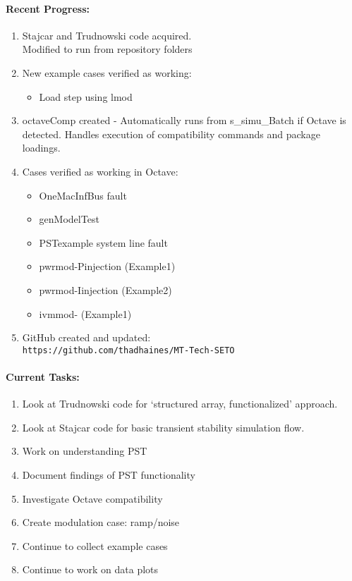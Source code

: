 \documentclass[12pt]{article}
\begin{document}
\begin{multicols}{2}
\raggedright

\paragraph{Recent Progress:}
	\begin{enumerate}
		\itemsep0em 
		\item Stajcar and Trudnowski code acquired. \\ 
		Modified to run from repository folders
		\item New example cases verified as working:
		\begin{itemize}
			\item Load step using lmod
		\end{itemize}
		\item octaveComp created - Automatically runs from s\_simu\_Batch if Octave is detected. Handles execution of compatibility commands and package loadings.
		
		\item Cases verified as working in Octave:
				\begin{itemize}
					\itemsep0em 
					\footnotesize
					\item OneMacInfBus fault
					\item genModelTest
					\item PSTexample system line fault
					\item pwrmod-Pinjection (Example1)
					\item pwrmod-Iinjection (Example2)
					\item ivmmod- (Example1)
				\end{itemize}
		
		\item GitHub created and updated:\\
	{\footnotesize	\verb|https://github.com/thadhaines/MT-Tech-SETO| }\\
	\end{enumerate}
	

	
\paragraph{Current Tasks:}
	\begin{enumerate}
		\itemsep 0em 
		\item Look at Trudnowski code for `structured array, functionalized' approach.
		\item Look at Stajcar code for basic transient stability simulation flow.
		\item Work on understanding PST
		\item Document findings of PST functionality
		\item Investigate Octave compatibility
		\item Create modulation case: ramp/noise 
		\item Continue to collect example cases
		\item Continue to work on data plots 
\end{enumerate}


\end{multicols}
\end{document}
